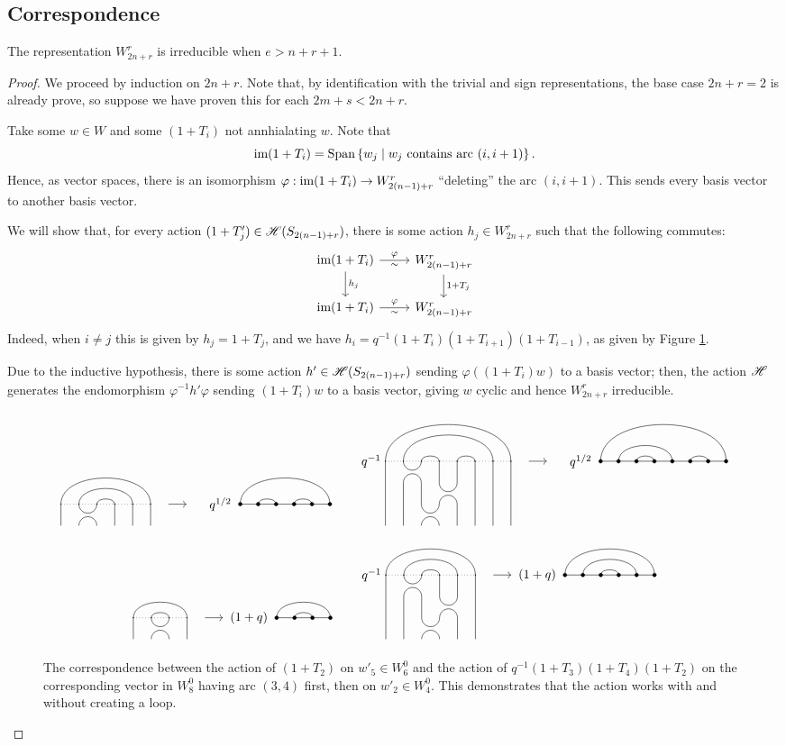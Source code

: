 \documentclass{amsart}
\begin{document}
\subsection{Correspondence}
\begin{proposition}
  The representation $W_{2n + r}^r$ is irreducible when $e > n + r + 1$. 
\end{proposition}
\begin{proof}
  We proceed by induction on $2n + r$.
  Note that, by identification with the trivial and sign representations, the base case $2n + r = 2$ is already prove, so suppose we have proven this for each $2m + s < 2n + r$.

  Take some $w \in W$ and some $(1 + T_i)$ not annhialating $w$.
  Note that \[\text{im} (1 + T_i) = \text{Span}\left\{ w_j \mid w_j \text{ contains arc }(i,i+1) \right\}.\]
  Hence, as vector spaces, there is an isomorphism $\varphi:\text{im}(1 + T_i) \rightarrow W_{2(n-1) + r}^r$ ``deleting'' the arc $(i,i+1)$.
  This sends every basis vector to another basis vector.

  We will show that, for every action $(1 + T_j') \in \mathscr{H}(S_{2(n-1) + r})$, there is some action $h_j \in W_{2n + r}^r$ such that the following commutes:
  \[
    \begin{tikzcd}
      \ima (1 + T_i) \arrow[r,"\varphi" above, "\sim" below] \arrow[d,"h_j"] & W_{2(n-1) + r}^r \arrow[d,"1 + T_j"]\\
      \ima (1 + T_i) \arrow[r,"\varphi" above, "\sim" below] & W_{2(n-1) + r}^r
    \end{tikzcd}
  \]
  Indeed, when $i \neq j$ this is given by $h_j = 1 + T_j$, and we have $h_i = q^{-1}(1 + T_i)(1 + T_{i+1})(1 + T_{i-1})$, as given by Figure \ref{bigloop}.
  
  Due to the inductive hypothesis, there is some action $h' \in \mathscr{H}(S_{2(n-1) + r})$ sending $\varphi((1 + T_i)w)$ to a basis vector;
  then, the action $\mathscr{H}$ generates the endomorphism $\varphi^{-1}h'\varphi$ sending $(1 + T_i)w$ to a basis vector, giving $w$ cyclic and hence $W_{2n + r}^r$ irreducible.
  \begin{figure}
  \[
    \Action{6}{1/6, 2/5, 3/4}{2}{1/6, 2/3, 4/5 }{q^{1/2}} \hspace{20pt} 
    \IsoAction{8}{1/8, 2/7, 3/4, 5/6}{3}{1/8, 2/5, 3/4, 6/7}{q^{1/2}}
  \]
  \[
    \Action{4}{1/4, 2/3}{2}{1/4,2/3}{(1 + q)} \hspace{20pt}
    \IsoAction{6}{1/6, 2/5, 3/4}{3}{1/6, 2/5, 3/4}{(1 + q)}
  \]
  \caption{The correspondence between the action of $(1 + T_2)$ on $w'_5 \in W^0_6$ and the action of $q^{-1}(1 + T_3)(1 + T_4)(1 + T_2)$ on the corresponding vector in $W^0_8$ having arc $(3,4)$ first, then on $w'_2 \in W^0_4$.
  This demonstrates that the action works with and without creating a loop.
  }
  \label{bigloop}
  \end{figure}
\end{proof}
\end{document}
